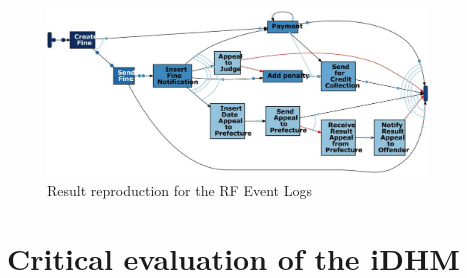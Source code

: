 \begin{figure}[H]
\begin{center}
\includegraphics[width=0.9\textwidth]{Chapters/Graphics_Paper/RFreprod.jpg}
\caption{Result reproduction for the RF Event Logs} 
\end{center}
\end{figure}


 \section{Critical evaluation of the iDHM}